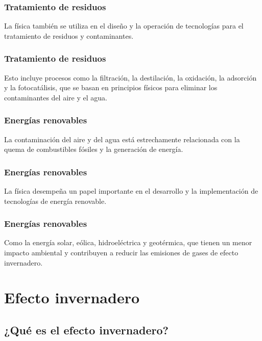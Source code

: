 \documentclass[14pt]{beamer}
\begin{document}
\begin{frame}
\frametitle{Tratamiento de residuos}
La física también se utiliza en el diseño y la operación de tecnologías para el tratamiento de residuos y contaminantes.
\end{frame}
\begin{frame}
\frametitle{Tratamiento de residuos}
Esto incluye procesos como la filtración, la destilación, la oxidación, la adsorción y la fotocatálisis, que se basan en principios físicos para eliminar los contaminantes del aire y el agua.
\end{frame}
\begin{frame}
\frametitle{Energías renovables}
La contaminación del aire y del agua está estrechamente relacionada con la quema de combustibles fósiles y la generación de energía.
\end{frame}
\begin{frame}
\frametitle{Energías renovables}
La física desempeña un papel importante en el desarrollo y la implementación de tecnologías de energía renovable.
\end{frame}
\begin{frame}
\frametitle{Energías renovables}
Como la energía solar, eólica, hidroeléctrica y geotérmica, que tienen un menor impacto ambiental y contribuyen a reducir las emisiones de gases de efecto invernadero.
\end{frame}

\section{Efecto invernadero}
\subsection{¿Qué es el efecto invernadero?}
\end{document}
